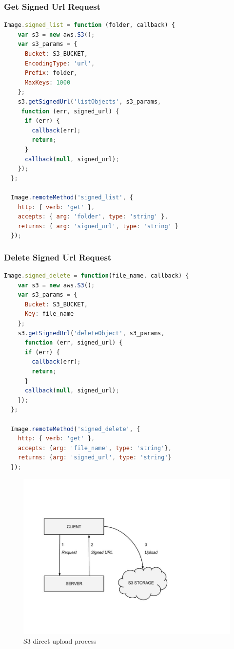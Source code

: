\subsubsection{Get Signed Url Request}

\begin{lstlisting}[language=javascript]
Image.signed_list = function (folder, callback) {
    var s3 = new aws.S3();
    var s3_params = {
      Bucket: S3_BUCKET,
      EncodingType: 'url',
      Prefix: folder,
      MaxKeys: 1000
    };
    s3.getSignedUrl('listObjects', s3_params,
     function (err, signed_url) {
      if (err) {
        callback(err);
        return;
      }
      callback(null, signed_url);
    });
  };

  Image.remoteMethod('signed_list', {
    http: { verb: 'get' },
    accepts: { arg: 'folder', type: 'string' },
    returns: { arg: 'signed_url', type: 'string' }
  });
\end{lstlisting}


\subsubsection{Delete Signed Url Request}

\begin{lstlisting}[language=javascript]
Image.signed_delete = function(file_name, callback) {
    var s3 = new aws.S3();
    var s3_params = {
      Bucket: S3_BUCKET,
      Key: file_name
    };
    s3.getSignedUrl('deleteObject', s3_params,
      function (err, signed_url) {
      if (err) {
        callback(err);
        return;
      }
      callback(null, signed_url);
    });
  };

  Image.remoteMethod('signed_delete', {
    http: { verb: 'get' },
    accepts: {arg: 'file_name', type: 'string'},
    returns: {arg: 'signed_url', type: 'string'}
  });

\end{lstlisting}


\begin {figure}[h]
\graphicspath{{images/chapter_s3/}}
\includegraphics[width=\textwidth]{s3_upload}
\caption{S3 direct upload process}
\end {figure}



